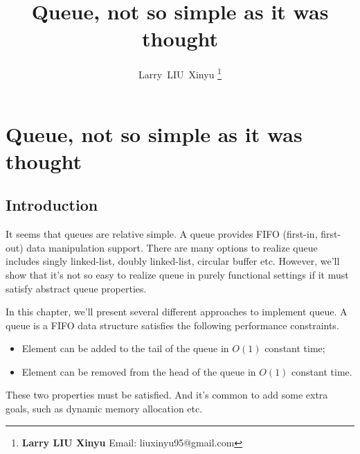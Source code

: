\documentclass{article}
\begin{document}


\title{Queue, not so simple as it was thought}

\author{Larry~LIU~Xinyu
\thanks{{\bfseries Larry LIU Xinyu } \newline
  Email: liuxinyu95@gmail.com \newline}
  }

\maketitle
\fi


\ifx\wholebook\relax
\chapter{Queue, not so simple as it was thought}
\fi

\section{Introduction}
\label{introduction}
It seems that queues are relative simple. A queue provides FIFO (first-in,
first-out) data manipulation support. There are many options to
realize queue includes singly linked-list, doubly linked-list,
circular buffer etc. However, we'll show that it's not so easy to
realize queue in purely functional settings if it must satisfy
abstract queue properties.

In this chapter, we'll present several different approaches to
implement queue. A queue is a FIFO data structure satisfies the
following performance constraints.

\begin{itemize}
\item Element can be added to the tail of the queue in $O(1)$ constant time;
\item Element can be removed from the head of the queue in $O(1)$ constant time.
\end{itemize}

These two properties must be satisfied. And it's common to add some extra
goals, such as dynamic memory allocation etc.
\end{document}
